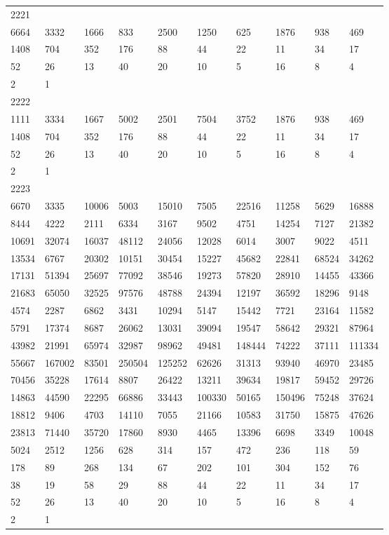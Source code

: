 \begin{longtable}{*{10}{l}}
2221&&&&&&&&&\\
6664& 3332& 1666& 833& 2500& 1250& 625& 1876& 938& 469\\
1408& 704& 352& 176& 88& 44& 22& 11& 34& 17\\
52& 26& 13& 40& 20& 10& 5& 16& 8& 4\\
2& 1& \\

2222&&&&&&&&&\\
1111& 3334& 1667& 5002& 2501& 7504& 3752& 1876& 938& 469\\
1408& 704& 352& 176& 88& 44& 22& 11& 34& 17\\
52& 26& 13& 40& 20& 10& 5& 16& 8& 4\\
2& 1& \\

2223&&&&&&&&&\\
6670& 3335& 10006& 5003& 15010& 7505& 22516& 11258& 5629& 16888\\
8444& 4222& 2111& 6334& 3167& 9502& 4751& 14254& 7127& 21382\\
10691& 32074& 16037& 48112& 24056& 12028& 6014& 3007& 9022& 4511\\
13534& 6767& 20302& 10151& 30454& 15227& 45682& 22841& 68524& 34262\\
17131& 51394& 25697& 77092& 38546& 19273& 57820& 28910& 14455& 43366\\
21683& 65050& 32525& 97576& 48788& 24394& 12197& 36592& 18296& 9148\\
4574& 2287& 6862& 3431& 10294& 5147& 15442& 7721& 23164& 11582\\
5791& 17374& 8687& 26062& 13031& 39094& 19547& 58642& 29321& 87964\\
43982& 21991& 65974& 32987& 98962& 49481& 148444& 74222& 37111& 111334\\
55667& 167002& 83501& 250504& 125252& 62626& 31313& 93940& 46970& 23485\\
70456& 35228& 17614& 8807& 26422& 13211& 39634& 19817& 59452& 29726\\
14863& 44590& 22295& 66886& 33443& 100330& 50165& 150496& 75248& 37624\\
18812& 9406& 4703& 14110& 7055& 21166& 10583& 31750& 15875& 47626\\
23813& 71440& 35720& 17860& 8930& 4465& 13396& 6698& 3349& 10048\\
5024& 2512& 1256& 628& 314& 157& 472& 236& 118& 59\\
178& 89& 268& 134& 67& 202& 101& 304& 152& 76\\
38& 19& 58& 29& 88& 44& 22& 11& 34& 17\\
52& 26& 13& 40& 20& 10& 5& 16& 8& 4\\
2& 1& \\


\end{longtable}
